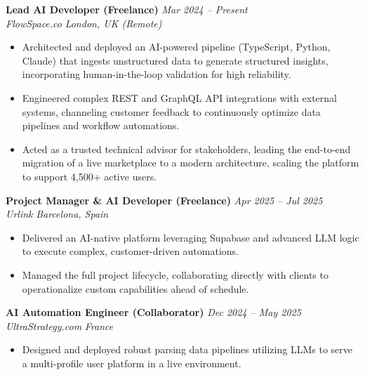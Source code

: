 \documentclass[11pt,a4paper]{article}
\begin{document}
\noindent \textbf{Lead AI Developer (Freelance)} \hfill \textit{Mar 2024 -- Present} \\
\textit{FlowSpace.co} \hfill \textit{London, UK (Remote)}
\begin{itemize}[leftmargin=*, noitemsep]
    \item Architected and deployed an AI-powered pipeline (TypeScript, Python, Claude) that ingests unstructured data to generate structured insights, incorporating human-in-the-loop validation for high reliability.
    \item Engineered complex REST and GraphQL API integrations with external systems, channeling customer feedback to continuously optimize data pipelines and workflow automations.
    \item Acted as a trusted technical advisor for stakeholders, leading the end-to-end migration of a live marketplace to a modern architecture, scaling the platform to support 4,500+ active users.
\end{itemize}

\vspace{6pt}

\noindent \textbf{Project Manager \& AI Developer (Freelance)} \hfill \textit{Apr 2025 -- Jul 2025} \\
\textit{Urlink} \hfill \textit{Barcelona, Spain}
\begin{itemize}[leftmargin=*, noitemsep]
    \item Delivered an AI-native platform leveraging Supabase and advanced LLM logic to execute complex, customer-driven automations.
    \item Managed the full project lifecycle, collaborating directly with clients to operationalize custom capabilities ahead of schedule.
\end{itemize}

\vspace{6pt}

\noindent \textbf{AI Automation Engineer (Collaborator)} \hfill \textit{Dec 2024 -- May 2025} \\
\textit{UltraStrategy.com} \hfill \textit{France}
\begin{itemize}[leftmargin=*, noitemsep]
    \item Designed and deployed robust parsing data pipelines utilizing LLMs to serve a multi-profile user platform in a live environment.
\end{itemize}

\vspace{6pt}
\end{document}
